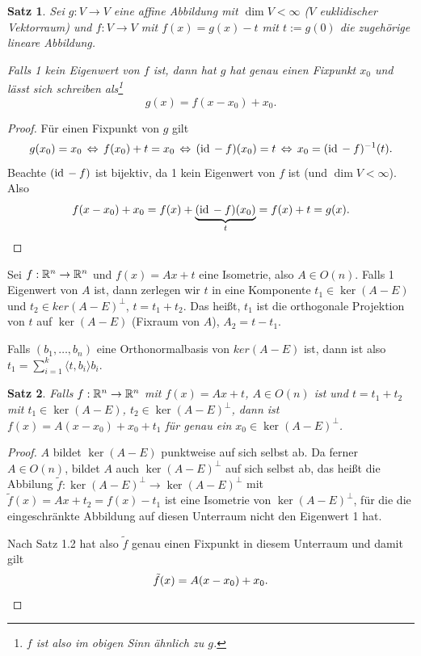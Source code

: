 \documentclass[
 a4paper,
 12pt,
 parskip=half
 ]{scrartcl}
\theoremstyle{plain}
\newtheorem{thm}{Satz}[section] %
\theoremstyle{definition}
\begin{document}
\begin{thm}
 Sei $g: V \to V$ eine affine Abbildung mit $\dim V < \infty$ ($V$ euklidischer Vektorraum) und $f: V \to V$ mit $f(x) = g(x) - t$ mit $t := g(0)$ die zugehörige lineare Abbildung.
 
 Falls 1 \emph{kein} Eigenwert von $f$ ist, dann hat $g$ hat genau einen Fixpunkt $x_0$ und lässt sich schreiben als\footnote{$f$ ist also im obigen Sinn ähnlich zu $g$.}
 \[ g(x) = f(x-x_0) + x_0. \]
\end{thm}

\begin{proof}
 Für einen Fixpunkt von $g$ gilt
 \[ g(x_0) = x_0 \,\Leftrightarrow\, f(x_0) + t = x_0 \,\Leftrightarrow\, (\mathrm{id}\, - f)(x_0) = t \,\Leftrightarrow\, x_0 = (\mathrm{id}\, - f)^{-1}(t). \]
 Beachte $(\mathrm{id}\, -f)$ ist bijektiv, da 1 kein Eigenwert von $f$ ist (und $\dim V < \infty$). Also
 \[ f(x - x_0) + x_0 = f(x) + \underbrace{(\mathrm{id}\,-f)(x_0)}_{t} = f(x) + t = g(x). \]
\end{proof}

Sei $f:\mathbb{R}^n \to \mathbb{R}^n$ und $f(x) = Ax + t$ eine Isometrie, also $A \in O(n)$. Falls 1 Eigenwert von $A$ ist, dann zerlegen wir $t$ in eine Komponente $t_1 \in \ker(A-E)$ und $t_2 \in ker(A-E)^\bot$, $t = t_1 + t_2$. Das heißt, $t_1$ ist die orthogonale Projektion von $t$ auf $\ker(A-E)$ (Fixraum von $A$), $A_2 = t - t_1$.

\begin{bem}
 Falls $(b_1, \ldots, b_n)$ eine Orthonormalbasis von $ker(A-E)$ ist, dann ist also $t_1 = \sum_{i=1}^k \langle t, b_i \rangle b_i$.
\end{bem}

\begin{thm}
 Falls $f: \mathbb{R}^n \to \mathbb{R}^n$ mit $f(x) = Ax + t$, $A \in O(n)$ ist und $t = t_1 + t_2$ mit $t_1 \in \ker(A-E)$, $t_2 \in \ker(A-E)^\bot$, dann ist $f(x) = A(x-x_0) + x_0 + t_1$ für genau ein $x_0 \in \ker(A-E)^\bot$.
\end{thm}

\begin{proof}
 $A$ bildet $\ker(A-E)$ punktweise auf sich selbst ab. Da ferner $A \in O(n)$, bildet $A$ auch $\ker(A-E)^\bot$ auf sich selbst ab, das heißt die Abbilung $\tilde{f}: \ker(A-E)^\bot \to \ker(A-E)^\bot$ mit $\tilde{f}(x) = Ax + t_2 = f(x) - t_1$ ist eine Isometrie von $\ker(A-E)^\bot$, für die die eingeschränkte Abbildung auf diesen Unterraum nicht den Eigenwert 1 hat.
 
 Nach Satz 1.2 hat also $\tilde{f}$ genau einen Fixpunkt in diesem Unterraum und damit gilt
 \[ \tilde{f}(x) = A(x-x_0) + x_0. \qedhere \]
\end{proof}
\end{document}

